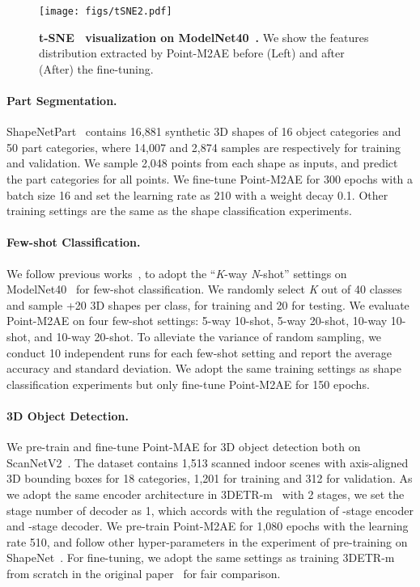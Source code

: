 \documentclass{article}
\makeatletter
\newcommand\figcaption{\def\@captype{figure}\caption}
\makeatother
\begin{document}
\begin{figure}[t!]
\vspace{0.3cm}
\centering
\texttt{[image: figs/tSNE2.pdf]}
\figcaption{\textbf{t-SNE~\cite{van2008visualizing} visualization on ModelNet40~\cite{modelnet40}.} We show the features distribution extracted by Point-M2AE before (Left) and after (After) the fine-tuning.}
\vspace{-0.3cm}
\label{tsne}
\end{figure}

\paragraph{Part Segmentation.}
ShapeNetPart~\cite{shapenetpart} contains 16,881 synthetic 3D shapes of 16 object categories and 50 part categories, where 14,007 and 2,874 samples are respectively for training and validation. We sample 2,048 points from each shape as inputs, and predict the part categories for all points. We fine-tune Point-M2AE for 300 epochs with a batch size 16 and set the learning rate as 210 with a weight decay 0.1. Other training settings are the same as the shape classification experiments.

\paragraph{Few-shot Classification.}
We follow previous works~\cite{pointbert,afham2022crosspoint,occo}, to adopt the ``\textit{K}-way \textit{N}-shot'' settings on ModelNet40~\cite{modelnet40} for few-shot classification. We randomly select \textit{K} out of 40 classes and sample +20 3D shapes per class,  for training and 20 for testing. We evaluate Point-M2AE on four few-shot settings: 5-way 10-shot, 5-way 20-shot, 10-way 10-shot, and 10-way 20-shot. To alleviate the variance of random sampling, we conduct 10 independent runs for each few-shot setting and report the average accuracy and standard deviation. We adopt the same training settings as shape classification experiments but only fine-tune Point-M2AE for 150 epochs.

\paragraph{3D Object Detection.}
We pre-train and fine-tune Point-MAE for 3D object detection both on ScanNetV2~\cite{ScanNetV2}. The dataset contains 1,513 scanned indoor scenes with axis-aligned 3D bounding boxes for 18 categories, 1,201 for training and 312 for validation. As we adopt the same encoder architecture in 3DETR-m~\cite{3detr} with 2 stages, we set the stage number of decoder as 1, which accords with the regulation of -stage encoder and -stage decoder.
We pre-train Point-M2AE for 1,080 epochs with the learning rate 510, and follow other hyper-parameters in the experiment of pre-training on ShapeNet~\cite{chang2015shapenet}. For fine-tuning, we adopt the same settings as training 3DETR-m from scratch in the original paper~\cite{3detr} for fair comparison.
\end{document}
